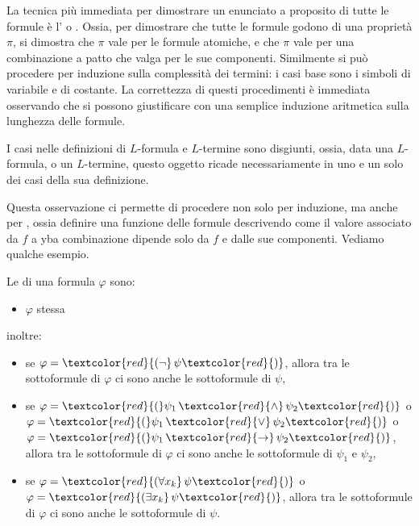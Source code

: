 La tecnica più immediata per dimostrare un enunciato a proposito di tutte le formule è l' o . Ossia, per dimostrare che tutte le formule godono di una proprietà $\pi$,
si dimostra che $\pi$ vale per le formule atomiche, e che $\pi$ vale per una combinazione a patto che valga per le sue componenti. Similmente si può procedere per induzione sulla complessità dei termini: i casi base sono i simboli di variabile e di costante.
La correttezza di questi procedimenti è immediata osservando che si possono giustificare con una semplice induzione aritmetica sulla lunghezza delle formule.

\begin{remark}
    I casi nelle definizioni di $L$-formula e $L$-termine sono disgiunti, ossia, data una $L$-formula, o un $L$-termine, questo oggetto ricade necessariamente in uno e un solo dei casi della sua definizione.
\end{remark}

Questa osservazione ci permette di procedere non solo per induzione, ma anche per , ossia definire una funzione delle formule descrivendo come il valore associato da $f$ a yba combinazione
dipende solo da $f$ e dalle sue componenti. Vediamo qualche esempio.

\begin{definition}
    [Sottoformula]
    Le  di una formula $\varphi$ sono:
    \begin{itemize}
        \item $\varphi$ stessa
    \end{itemize}
    inoltre:
    \begin{itemize}
        \item se $\varphi = \textcolor{red}{(\neg}\, \psi \textcolor{red}{)}$, allora tra le sottoformule di $\varphi$ ci sono anche le sottoformule di $\psi$,
        \item se $\varphi = \textcolor{red}{(} \psi_1 \,\textcolor{red}{\land} \,\psi_2 \textcolor{red}{)}$ o $\varphi = \textcolor{red}{(} \psi_1\, \textcolor{red}{\lor}\, \psi_2 \textcolor{red}{)}$ o
        $\varphi = \textcolor{red}{(} \psi_1\, \textcolor{red}{\to} \,\psi_2 \textcolor{red}{)}$, allora tra le sottoformule di $\varphi$ ci sono anche le sottoformule di $\psi_1$ e $\psi_2$,
        \item se $\varphi = \textcolor{red}{(\forall x_k} \,\psi \textcolor{red}{)}$ o $\varphi = \textcolor{red}{(\exists x_k}\, \psi \textcolor{red}{)}$, allora tra le sottoformule di $\varphi$ ci sono anche le sottoformule di $\psi$.
    \end{itemize}
\end{definition}

